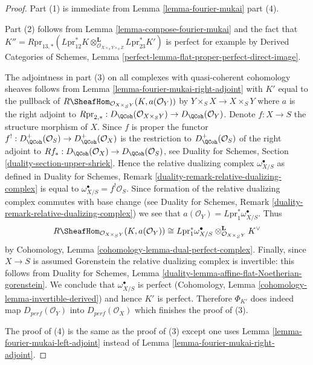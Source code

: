 \begin{proof}
Part (1) is immediate from Lemma \ref{lemma-fourier-mukai} part (4).

\medskip\noindent
Part (2) follows from Lemma \ref{lemma-compose-fourier-mukai} and the
fact that
$K'' = R\text{pr}_{13, *}(
L\text{pr}_{12}^*K
\otimes_{\mathcal{O}_{X \times_S Y \times_S Z}}^\mathbf{L}
L\text{pr}_{23}^*K')$ is perfect for example by
Derived Categories of Schemes, Lemma
\ref{perfect-lemma-flat-proper-perfect-direct-image}.

\medskip\noindent
The adjointness in part (3) on all complexes with quasi-coherent cohomology
sheaves follows from Lemma \ref{lemma-fourier-mukai-right-adjoint} with
$K'$ equal to the pullback of
$R\SheafHom_{\mathcal{O}_{X \times_S Y}}(K, a(\mathcal{O}_Y))$
by $Y \times_S X \to X \times_S Y$ where $a$ is the right adjoint
to $R\text{pr}_{2, *} : D_\QCoh(\mathcal{O}_{X \times_S Y}) \to
D_\QCoh(\mathcal{O}_Y)$. Denote $f : X \to S$ the structure morphism of $X$.
Since $f$ is proper the functor
$f^! : D_\QCoh^+(\mathcal{O}_S) \to D_\QCoh^+(\mathcal{O}_X)$
is the restriction to $D_\QCoh^+(\mathcal{O}_S)$
of the right adjoint to
$Rf_* : D_\QCoh(\mathcal{O}_X) \to D_\QCoh(\mathcal{O}_S)$, see
Duality for Schemes, Section \ref{duality-section-upper-shriek}.
Hence the relative dualizing complex $\omega_{X/S}^\bullet$ as defined in
Duality for Schemes, Remark
\ref{duality-remark-relative-dualizing-complex}
is equal to $\omega_{X/S}^\bullet = f^!\mathcal{O}_S$.
Since formation of the relative dualizing complex
commutes with base change (see Duality for Schemes, Remark
\ref{duality-remark-relative-dualizing-complex}) we see that
$a(\mathcal{O}_Y) = L\text{pr}_1^*\omega_{X/S}^\bullet$.
Thus
$$
R\SheafHom_{\mathcal{O}_{X \times_S Y}}(K, a(\mathcal{O}_Y))
\cong
L\text{pr}_1^*\omega_{X/S}^\bullet
\otimes_{\mathcal{O}_{X \times_S Y}}^\mathbf{L} K^\vee
$$
by Cohomology, Lemma \ref{cohomology-lemma-dual-perfect-complex}.
Finally, since $X \to S$ is assumed Gorenstein the relative dualizing complex
is invertible: this follows from Duality for Schemes, Lemma
\ref{duality-lemma-affine-flat-Noetherian-gorenstein}.
We conclude that $\omega_{X/S}^\bullet$ is perfect
(Cohomology, Lemma \ref{cohomology-lemma-invertible-derived})
and hence $K'$ is perfect.
Therefore $\Phi_{K'}$ does indeed map $D_{perf}(\mathcal{O}_Y)$
into $D_{perf}(\mathcal{O}_X)$ which finishes the proof of (3).

\medskip\noindent
The proof of (4) is the same as the proof of (3) except one uses
Lemma \ref{lemma-fourier-mukai-left-adjoint} instead of
Lemma \ref{lemma-fourier-mukai-right-adjoint}.
\end{proof}














